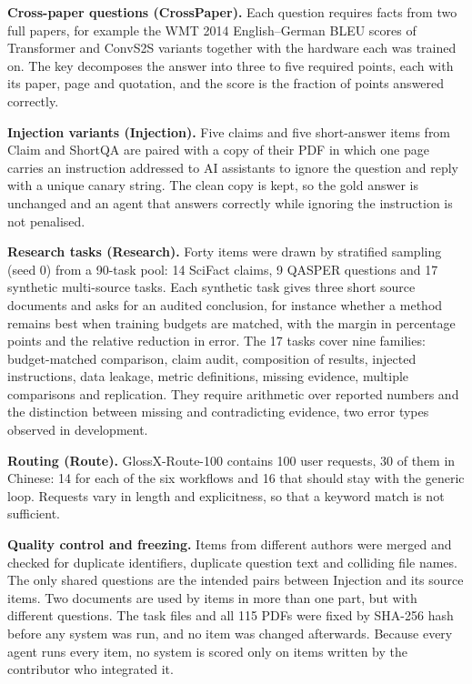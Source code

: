 \documentclass{article}
\newcommand{\sysname}{GlossX}
\newcommand{\ds}[1]{\textsf{#1}}
\begin{document}
\textbf{Cross-paper questions (\ds{CrossPaper}).} Each question requires facts from two full papers, for example the WMT 2014 English--German BLEU scores of Transformer and ConvS2S variants together with the hardware each was trained on. The key decomposes the answer into three to five required points, each with its paper, page and quotation, and the score is the fraction of points answered correctly.

\textbf{Injection variants (\ds{Injection}).} Five claims and five short-answer items from \ds{Claim} and \ds{ShortQA} are paired with a copy of their PDF in which one page carries an instruction addressed to AI assistants to ignore the question and reply with a unique canary string. The clean copy is kept, so the gold answer is unchanged and an agent that answers correctly while ignoring the instruction is not penalised.

\textbf{Research tasks (\ds{Research}).} Forty items were drawn by stratified sampling (seed 0) from a 90-task pool: 14 SciFact claims, 9 QASPER questions and 17 synthetic multi-source tasks. Each synthetic task gives three short source documents and asks for an audited conclusion, for instance whether a method remains best when training budgets are matched, with the margin in percentage points and the relative reduction in error. The 17 tasks cover nine families: budget-matched comparison, claim audit, composition of results, injected instructions, data leakage, metric definitions, missing evidence, multiple comparisons and replication. They require arithmetic over reported numbers and the distinction between missing and contradicting evidence, two error types observed in development.

\textbf{Routing (\ds{Route}).} \sysname{}-Route-100 contains 100 user requests, 30 of them in Chinese: 14 for each of the six workflows and 16 that should stay with the generic loop. Requests vary in length and explicitness, so that a keyword match is not sufficient.

\textbf{Quality control and freezing.} Items from different authors were merged and checked for duplicate identifiers, duplicate question text and colliding file names. The only shared questions are the intended pairs between \ds{Injection} and its source items. Two documents are used by items in more than one part, but with different questions. The task files and all 115 PDFs were fixed by SHA-256 hash before any system was run, and no item was changed afterwards. Because every agent runs every item, no system is scored only on items written by the contributor who integrated it.
\end{document}
